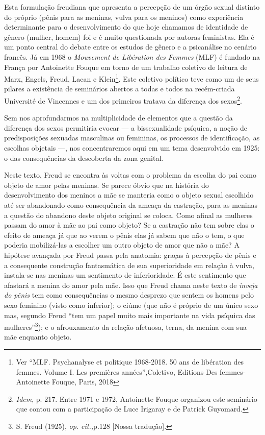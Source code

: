 Esta formulação freudiana que apresenta a percepção de um órgão sexual
distinto do próprio (pênis para as meninas, vulva para os meninos) como
experiência determinante para o desenvolvimento do que hoje chamamos de
identidade de gênero (mulher, homem) foi e é muito questionada por
autoras feministas. Ela é um ponto central do debate entre os estudos de
gênero e a psicanálise no cenário francês. Já em 1968 o \emph{Mouvement
de Libération des Femmes} (MLF) é fundado na França por Antoinette
Fouque em torno de um trabalho coletivo de leitura de Marx, Engels,
Freud, Lacan e Klein\footnote{Ver ``MLF. Psychanalyse et politique
  1968-2018. 50 ans de libération des femmes. Volume I. Les premières
  années'',Coletivo, Editions Des femmes-Antoinette Fouque, Paris, 2018}.
Este coletivo político teve como um de seus pilares a existência de
seminários abertos a todas e todos na recém-criada Université de
Vincennes e um dos primeiros tratava da diferença dos sexos\footnote{\emph{Idem},
  p. 217. Entre 1971 e 1972, Antoinette Fouque organizou este seminário
  que contou com a participação de Luce Irigaray e de Patrick Guyomard.}.

Sem nos aprofundarmos na multiplicidade de elementos que a questão da
diferença dos sexos permitiria evocar --- a bissexualidade psíquica, a
noção de predisposições sexuadas masculinas ou femininas, os processos
de identificação, as escolhas objetais ---, nos concentraremos aqui em um
tema desenvolvido em 1925: o das consequências da descoberta da zona
genital.

Neste texto, Freud se encontra às voltas com o problema da escolha do
pai como objeto de amor pelas meninas. Se parece óbvio que na história
do desenvolvimento dos meninos a mãe se manteria como o objeto sexual
escolhido até ser abandonado como consequência da ameaça da castração,
para as meninas a questão do abandono deste objeto original se coloca.
Como afinal as mulheres passam do amor à mãe ao pai como objeto? Se a
castração não tem sobre elas o efeito de ameaça já que ao verem o pênis
elas já sabem que não o tem, o que poderia mobilizá-las a escolher um
outro objeto de amor que não a mãe? A hipótese avançada por Freud passa
pela anatomia: graças à percepção de pênis e a consequente construção
fantasmática de sua superioridade em relação à vulva, instala-se nas
meninas um sentimento de inferioridade. É este sentimento que afastará a
menina do amor pela mãe. Isso que Freud chama neste texto de
\emph{inveja do pênis} tem como consequências o mesmo desprezo que
sentem os homens pelo sexo feminino (visto como inferior); o ciúme (que
não é próprio de um único sexo mas, segundo Freud ``tem um papel muito
mais importante na vida psíquica das mulheres''\footnote{S. Freud
  (1925), \emph{op. cit.,}p.128 {[}Nossa tradução{]}.}); e o
afrouxamento da relação afetuosa, terna, da menina com sua mãe enquanto
objeto.

